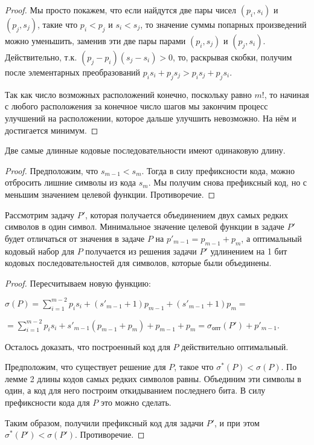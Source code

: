\begin{proof}
    Мы просто покажем, что если найдутся две пары чисел $(p_i, s_i)$ и $(p_j,s_j)$, такие что $p_i < p_j$ и $s_i < s_j$, то значение суммы попарных произведений можно уменьшить, заменив эти две пары парами $(p_i, s_j)$ и $(p_j, s_i)$. Действительно, т.к. $(p_j - p_i)(s_j - s_i) > 0$, то, раскрывая скобки, получим после элементарных преобразований $p_is_i+p_js_j>p_is_j+p_js_i$.

    Так как число возможных расположений конечно, поскольку равно $m!$, то начиная с любого расположения за конечное число шагов мы закончим процесс улучшений на расположении, которое дальше улучшить невозможно. На нём и достигается минимум.
\end{proof}

\begin{lemma}
    Две самые длинные кодовые последовательности имеют одинаковую длину.
\end{lemma}

\begin{proof}
    Предположим, что $s_{m-1} < s_m$. Тогда в силу префиксности кода, можно отбросить лишние символы из кода $s_m.$ Мы получим снова префиксный код, но с меньшим значением целевой функции. Противоречие.
\end{proof}

\begin{lemma}
    Рассмотрим задачу $P'$, которая получается объединением двух самых редких символов в один символ. Минимальное значение целевой функции 
    в задаче $P'$ будет отличаться от значения в задаче $P$ на $p'_{m-1} = p_{m-1} +p_m$, а оптимальный кодовый
    набор для $P$ получается из решения задачи $P'$ удлинением на 1 бит кодовых последовательностей для символов, которые были объединены.
\end{lemma}

\begin{proof}
    Пересчитываем новую функцию:

$\sigma(P)=\sum\limits_{i=1}^{m-2}p_is_i+(s'_{m-1}+1)p_{m-1}+(s'_{m-1}+1)p_m=$

$=\sum\limits_{i=1}^{m-2}p_is_i+s'_{m-1}(p_{m-1}+p_m)+p_{m-1}+p_m=\sigma_{опт}(P')+p'_{m-1}$.

Осталось доказать, что построенный код для $P$ действительно оптимальный.

Предположим, что существует решение для $P$, такое что $\sigma^*(P)<\sigma(P).$ По лемме 2 длины кодов самых редких символов равны. Объединим эти символы в один, а код для него построим откидыванием последнего бита. В силу префиксности кода для $P$ это можно сделать.

Таким образом, получили префиксный код для задачи $P'$, и при этом $\sigma^*(P') < \sigma(P').$ Противоречие.
\end{proof}

